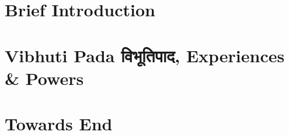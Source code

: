\section[Intro]{Brief Introduction}


\section[Vibhutipad]{Vibhuti Pada विभूतिपाद, Experiences \& Powers}


\section[End]{Towards End}

